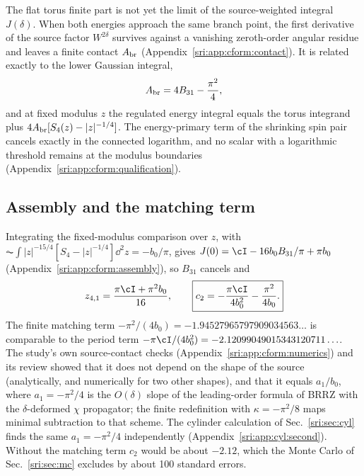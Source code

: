 The flat torus finite part is not yet the limit of the source-weighted integral $J(\delta)$. When both energies
approach the same branch point, the first derivative of the source factor $W^{2\delta}$ survives against a vanishing
zeroth-order angular residue and leaves a finite contact $A_{\rm br}$ (Appendix~\ref{sri:app:cform:contact}). It is
related exactly to the lower Gaussian integral,
\begin{equation}
 A_{\rm br}=4B_{31}-\frac{\pi^2}{4},
\end{equation}
and at fixed modulus $z$ the regulated energy integral equals the torus integrand plus $4A_{\rm br}[S_4(z)-|z|^{-1/4}]$.
The energy-primary term of the shrinking spin pair cancels exactly in the connected logarithm, and no scalar with a
logarithmic threshold remains at the modulus boundaries (Appendix~\ref{sri:app:cform:qualification}).

\subsection{Assembly and the matching term}\label{sri:sec:assembly2}
Integrating the fixed-modulus comparison over $z$, with $\AC\!\int|z|^{-15/4}[S_4-|z|^{-1/4}]\dd^2z=-b_0/\pi$, gives
$J(0)=\cI-16b_0B_{31}/\pi+\pi b_0$ (Appendix~\ref{sri:app:cform:assembly}), so $B_{31}$ cancels and
\begin{equation}
 z_{4,1}=\frac{\pi\cI+\pi^2b_0}{16},\qquad
 \boxed{c_2=-\frac{\pi\cI}{4b_0^2}-\frac{\pi^2}{4b_0}.}
 \label{sri:eq:c2I}
\end{equation}
The finite matching term $-\pi^2/(4b_0)=-1.94527965797909034563\ldots$ is comparable to the period term
$-\pi\cI/(4b_0^2)=-2.12099049015343120711\ldots$. The study's own source-contact checks (Appendix~\ref{sri:app:cform:numerics}) and its review showed that
it does not depend on the shape of the source (analytically, and numerically for two other shapes), and that it equals $a_1/b_0$, where $a_1=-\pi^2/4$
is the $O(\delta)$ slope of the leading-order formula of BRRZ with the $\delta$-deformed $\chi$ propagator; the finite
redefinition with $\kappa=-\pi^2/8$ maps minimal subtraction to that scheme. The cylinder calculation of
Sec.~\ref{sri:sec:cyl} finds the same $a_1=-\pi^2/4$ independently (Appendix~\ref{sri:app:cyl:second}). Without the matching term $c_2$ would be about $-2.12$,
which the Monte Carlo of Sec.~\ref{sri:sec:mc} excludes by about 100 standard errors.


